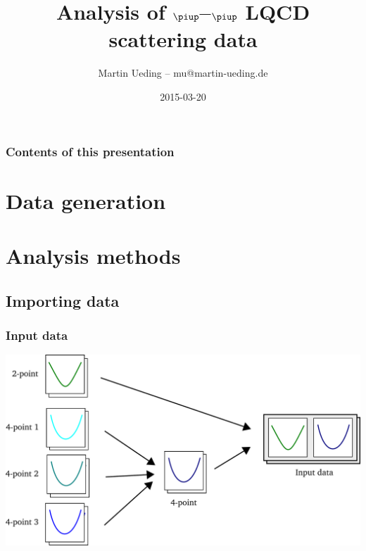 \documentclass[english, fleqn]{beamer}
\title{Analysis of $\piup$--$\piup$ LQCD scattering data}
\author{Martin Ueding – mu@martin-ueding.de}
\date{2015-03-20}
\begin{document}
\begin{frame}
    \titlepage
\end{frame}

\begin{frame}
    \frametitle{Contents of this presentation}
    \tableofcontents
\end{frame}


\section{Data generation}



\section{Analysis methods}

\newcommand\scale{0.2}

\subsection{Importing data}

\begin{frame}
    \frametitle{Input data}
    \begin{center}
        \includegraphics[scale=\scale]{sketches/01-input.pdf}
    \end{center}
\end{frame}
\end{document}
